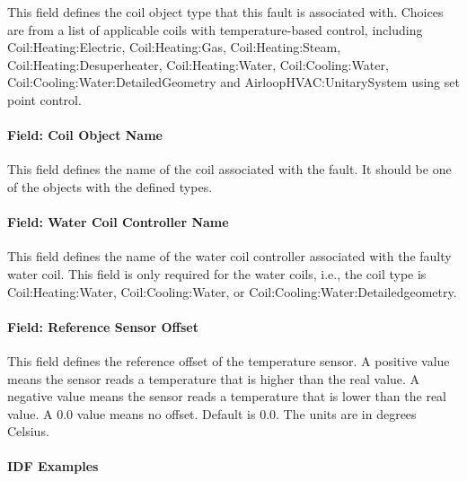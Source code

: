 This field defines the coil object type that this fault is associated with. Choices are from a list of applicable coils with temperature-based control, including Coil:Heating:Electric, Coil:Heating:Gas, Coil:Heating:Steam, Coil:Heating:Desuperheater, Coil:Heating:Water, Coil:Cooling:Water, Coil:Cooling:Water:DetailedGeometry and AirloopHVAC:UnitarySystem using set point control.

\paragraph{Field: Coil Object Name}\label{field-coil-object-name}

This field defines the name of the coil associated with the fault. It should be one of the objects with the defined types.

\paragraph{Field: Water Coil Controller Name}\label{field-water-coil-controller-name}

This field defines the name of the water coil controller associated with the faulty water coil. This field is only required for the water coils, i.e., the coil type is Coil:Heating:Water, Coil:Cooling:Water, or Coil:Cooling:Water:Detailedgeometry.

\paragraph{Field: Reference Sensor Offset}\label{field-reference-sensor-offset}

This field defines the reference offset of the temperature sensor. A positive value means the sensor reads a temperature that is higher than the real value. A negative value means the sensor reads a temperature that is lower than the real value. A 0.0 value means no offset. Default is 0.0. The units are in degrees Celsius.

\paragraph{IDF Examples}


